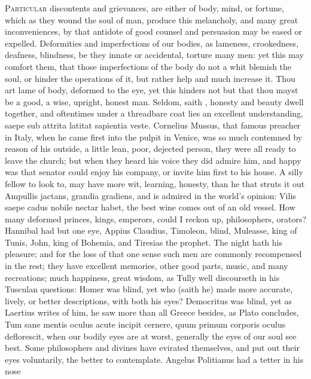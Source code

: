 {\lettrine{P}{articular} discontents and grievances, are either of body, mind, or
fortune, which as they wound the soul of man, produce this melancholy,
and many great inconveniences, by that antidote of good counsel and
persuasion may be eased or expelled. Deformities and imperfections of
our bodies, as lameness, crookedness, deafness, blindness, be they
innate or accidental, torture many men: yet this may comfort them, that
those imperfections of the body do not a whit blemish the soul, or
hinder the operations of it, but rather help and much increase it. Thou
art lame of body, deformed to the eye, yet this hinders not but that
thou mayst be a good, a wise, upright, honest man. Seldom, saith
\Plutarch, honesty and beauty dwell together, and oftentimes under a
threadbare coat lies an excellent understanding, saepe sub attrita
latitat sapientia veste. Cornelius Mussus, that famous preacher
in Italy, when he came first into the pulpit in Venice, was so much
contemned by reason of his outside, a little lean, poor, dejected
person, they were all ready to leave the church; but when they
heard his voice they did admire him, and happy was that senator could
enjoy his company, or invite him first to his house. A silly fellow to
look to, may have more wit, learning, honesty, than he that struts it
out Ampullis jactans, \etc{} grandia gradiens, and is admired in the
world's opinion: Vilis saepe cadus nobile nectar habet, the best wine
comes out of an old vessel. How many deformed princes, kings, emperors,
could I reckon up, philosophers, orators? Hannibal had but one eye,
Appius Claudius, Timoleon, blind, Muleasse, king of Tunis, John, king
of Bohemia, and Tiresias the prophet. The night hath his
pleasure; and for the loss of that one sense such men are commonly
recompensed in the rest; they have excellent memories, other good
parts, music, and many recreations; much happiness, great wisdom, as
Tully well discourseth in his  Tusculan questions: Homer was
blind, yet who (saith he) made more accurate, lively, or better
descriptions, with both his eyes? Democritus was blind, yet as Laertius
writes of him, he saw more than all Greece besides, as Plato
concludes, Tum sane mentis oculus acute incipit cernere, quum primum
corporis oculus deflorescit, when our bodily eyes are at worst,
generally the eyes of our soul see best. Some philosophers and divines
have evirated themselves, and put out their eyes voluntarily, the
better to contemplate. Angelus Politianus had a tetter in his nose
}
